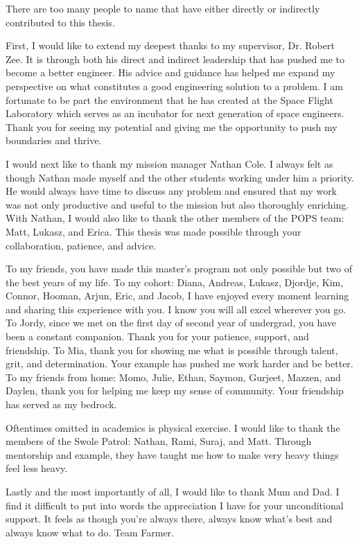 There are too many people to name that have either directly or indirectly
contributed to this thesis. 

First, I would like to extend my deepest thanks to my supervisor, Dr. Robert
Zee. It is through both his direct and indirect leadership that has pushed me
to become a better engineer. His advice and guidance has helped me expand my
perspective on what constitutes a good engineering solution to a problem. I am
fortunate to be part the environment that he has created at the Space Flight
Laboratory which serves as an incubator for next generation of space engineers.
Thank you for seeing my potential and giving me the opportunity to push my
boundaries and thrive.

I would next like to thank my mission manager Nathan Cole. I always felt as
though Nathan made myself and the other students working under him a priority.
He would always have time to discuss any problem and ensured that my work was
not only productive and useful to the mission but also thoroughly enriching.
With Nathan, I would also like to thank the other members of the POPS team:
Matt, Lukasz, and Erica. This thesis was made possible through your
collaboration, patience, and advice.  

To my friends, you have made this master's program not only possible but two of
the best years of my life. To my cohort: Diana, Andreas, Lukasz, Djordje, Kim,
Connor, Hooman, Arjun, Eric, and Jacob, I have enjoyed every moment learning
and sharing this experience with you. I know you will all excel wherever you
go. To Jordy, since we met on the first day of second year of undergrad, you
have been a constant companion. Thank you for your patience, support, and
friendship. To Mia, thank you for showing me what is possible through talent,
grit, and determination. Your example has pushed me work harder and be better.
To my friends from home: Momo, Julie, Ethan, Saymon, Gurjeet, Mazzen, and Daylen, thank
you for helping me keep my sense of community. Your friendship has served as my
bedrock. 

Oftentimes omitted in academics is physical exercise. I would like to thank the
members of the Swole Patrol: Nathan, Rami, Suraj, and Matt. Through mentorship
and example, they have taught me how to make very heavy things feel less heavy.

Lastly and the most importantly of all, I would like to thank Mum and Dad. I
find it difficult to put into words the appreciation I have for your
unconditional support. It feels as though you're always there, always know
what's best and always know what to do. Team Farmer.

